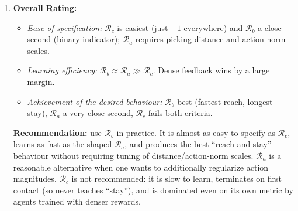 \documentclass[12pt]{scrartcl}
\begin{document}
\begin{enumerate}
\begin{enumerate}[label=(\alph*)]
\begin{enumerate}[label=(\roman*)]
            \item \textbf{Overall Rating:}
            \begin{itemize}
                \item \emph{Ease of specification:} $\mathcal{R}_c$ is easiest (just $-1$ everywhere) and $\mathcal{R}_b$ a close second (binary indicator); $\mathcal{R}_a$ requires picking distance and action-norm scales.
                \item \emph{Learning efficiency:} $\mathcal{R}_b\approx \mathcal{R}_a \gg \mathcal{R}_c$. Dense feedback wins by a large margin.
                \item \emph{Achievement of the desired behaviour:} $\mathcal{R}_b$ best (fastest reach, longest stay), $\mathcal{R}_a$ a very close second, $\mathcal{R}_c$ fails both criteria.
            \end{itemize}
            \textbf{Recommendation:} use $\mathcal{R}_b$ in practice. It is almost as easy to specify as $\mathcal{R}_c$, learns as fast as the shaped $\mathcal{R}_a$, and produces the best ``reach-and-stay'' behaviour without requiring tuning of distance/action-norm scales. $\mathcal{R}_a$ is a reasonable alternative when one wants to additionally regularize action magnitudes. $\mathcal{R}_c$ is not recommended: it is slow to learn, terminates on first contact (so never teaches ``stay''), and is dominated even on its own metric by agents trained with denser rewards.
        \end{enumerate}
    \end{enumerate}
\end{enumerate}
\end{document}
